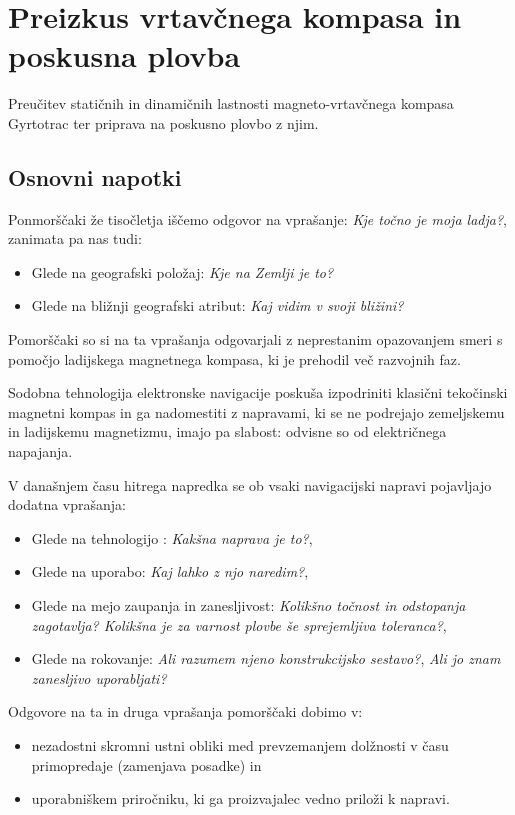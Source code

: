 %
\chapter{Preizkus vrtavčnega kompasa in poskusna plovba}
\label{Vaje:VrtKompas} %

Preučitev statičnih in dinamičnih lastnosti magneto-vrtavčnega kompasa Gyrtotrac ter priprava na poskusno plovbo z njim.

\section{Osnovni napotki}
\label{sec:VrtKompas_OsnNap}
Ponmorščaki že tisočletja iščemo odgovor na vprašanje: \textit{Kje točno je moja ladja?}, zanimata pa nas tudi:
\begin{itemize}
	\item Glede na geografski položaj: \textit{Kje na Zemlji je to?}
	\item Glede na bližnji geografski atribut: \textit{Kaj vidim v svoji bližini?} 	
\end{itemize}

Pomorščaki so si na ta vprašanja odgovarjali z neprestanim opazovanjem smeri s pomočjo ladijskega magnetnega kompasa, ki je prehodil več razvojnih faz.

Sodobna tehnologija elektronske navigacije poskuša izpodriniti klasični tekočinski magnetni kompas in ga nadomestiti z napravami, ki se ne podrejajo zemeljskemu in ladijskemu magnetizmu, imajo pa slabost: odvisne so od električnega napajanja. 

V današnjem času hitrega napredka se ob vsaki navigacijski napravi pojavljajo dodatna vprašanja:
\begin{itemize}
	\item Glede na tehnologijo : \textit{Kakšna naprava je to?},
	\item Glede na uporabo: \textit{Kaj lahko z njo naredim?},
	\item Glede na mejo zaupanja in zanesljivost: \textit{Kolikšno točnost in odstopanja zagotavlja? Kolikšna je za varnost plovbe še sprejemljiva toleranca?},
	\item Glede na rokovanje: \textit{Ali razumem njeno konstrukcijsko sestavo?}, \textit{Ali jo znam zanesljivo uporabljati?}
\end{itemize}

Odgovore na ta in druga vprašanja pomorščaki dobimo v:
\begin{itemize}
	\item nezadostni skromni ustni obliki med prevzemanjem dolžnosti v času primopredaje (zamenjava posadke) in
	\item uporabniškem priročniku, ki ga proizvajalec vedno priloži k napravi.
\end{itemize}

